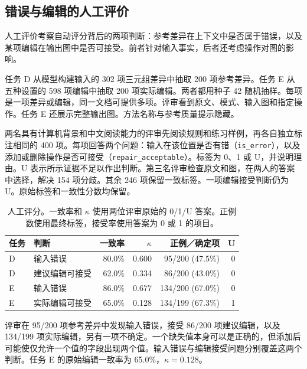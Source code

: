 \subsection{错误与编辑的人工评价}
\label{sec:eval:human}

人工评价考察自动评分背后的两项判断：参考差异在上下文中是否属于错误，以及某项编辑在输出图中是否可接受。前者针对输入事实，后者还考虑操作对图的影响。

任务 D 从模型构建输入的 302 项三元组差异中抽取 200 项参考差异。任务 E 从五种设置的 598 项编辑中抽取 200 项实际编辑。两者都用种子 42 随机抽样。每项是一项差异或编辑，同一文档可提供多项。评审看到原文、模式、输入图和指定操作。任务 E 还展示完整输出图。方法名称与参考质量提示隐藏。

两名具有计算机背景和中文阅读能力的评审先阅读规则和练习样例，再各自独立标注相同的 400 项。每项回答两个问题：输入在该位置是否有错（\texttt{is\_error}），以及添加或删除操作是否可接受（\texttt{repair\_acceptable}）。标签为 0、1 或 U，并说明理由。U 表示所示证据不足以作出判断。第三名评审检查原文和图，在两人的答案中选择，解决 154 项分歧。其余 246 项保留一致标签。一项编辑接受判断仍为 U。原始标签和一致性分数均保留。

\begin{table}[t]
\centering
\caption{人工评分。一致率和 $\kappa$ 使用两位评审原始的 0/1/U 答案。正例数使用最终标签，接受率使用答案为 0 或 1 的项目。}
\label{tab:human_review}
\small
\begin{tabular}{llrrrr}
\toprule
任务 & 判断 & 一致率 & $\kappa$ & 正例／确定项 & U \\
\midrule
D & 输入错误 & 80.0\% & 0.600 & 95/200 (47.5\%) & 0 \\
D & 建议编辑可接受 & 62.0\% & 0.334 & 86/200 (43.0\%) & 0 \\
E & 输入错误 & 86.0\% & 0.677 & 134/200 (67.0\%) & 0 \\
E & 实际编辑可接受 & 65.0\% & 0.128 & 134/199 (67.3\%) & 1 \\
\bottomrule
\end{tabular}
\end{table}

评审在 95/200 项参考差异中发现输入错误，接受 86/200 项建议编辑，以及 134/199 项实际编辑，另有一项不确定。一个缺失值本身可以是正确的，但添加后可能使仅允许一个值的字段出现两个值。输入错误与编辑接受问题分别覆盖这两个判断。任务 E 的原始编辑一致率为 65.0\%，$\kappa=0.128$。

